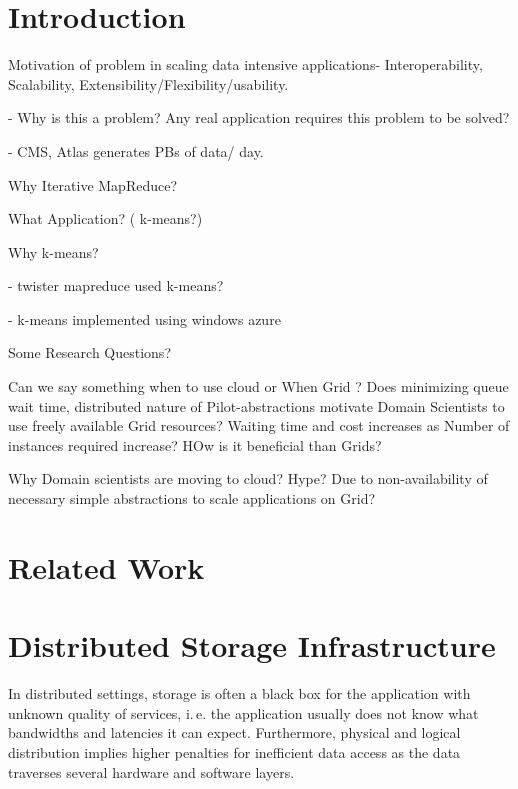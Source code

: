 \documentclass[times]{cpeauth}
\begin{document}

\vspace{-6pt}

\section{Introduction}
\vspace{-2pt}
Motivation of problem in scaling data intensive applications- 
Interoperability, Scalability, Extensibility/Flexibility/usability.

   - Why is this a problem? Any real application requires this problem to be solved?

   - CMS, Atlas generates PBs of data/ day.

Why Iterative MapReduce?

What Application?  ( k-means?)

Why k-means?

  - twister mapreduce used k-means?

  - k-means implemented using windows azure




Some Research Questions?
 
Can we say something when to use cloud or When Grid ? 
Does minimizing queue wait time, distributed nature of Pilot-abstractions motivate Domain Scientists to use freely available Grid resources? 
Waiting time and cost increases as Number of instances required increase? 
HOw is it beneficial than Grids? 

Why Domain scientists are moving to cloud? Hype? Due to non-availability of necessary simple abstractions to scale applications on Grid?


\section{Related Work}


\section{Distributed Storage Infrastructure}

In distributed settings, storage is often a black box for the application with
unknown quality of services, i.\,e. the application usually does not know what
bandwidths and latencies it can expect. Furthermore, physical and logical
distribution implies higher penalties for inefficient data access as the data
traverses several hardware and software layers.
\end{document}
